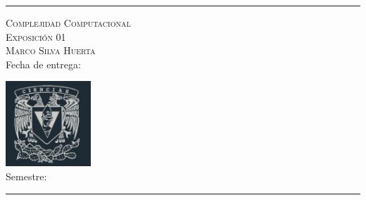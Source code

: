 \begin{center}
        \rule[1.5ex]{1\linewidth}{0.5mm} 
\end{center}

\begin{minipage}{12cm}
    {\Large\textsc{Complejidad Computacional}} \\

    {\large\textsc{Exposición 01}}\\            
    
    {\large \textsc{Marco Silva Huerta}}\\ 
    
    Fecha de entrega: \fecha
\end{minipage}
\begin{minipage}{4.1cm}
    \includegraphics[height=3.2cm]{assets/imagenes/cienciasBLRY.png}\\    
    Semestre: \semestre    
\end{minipage}

\begin{center}
    \rule[1.5ex]{1\linewidth}{0.5mm} 
\end{center}
